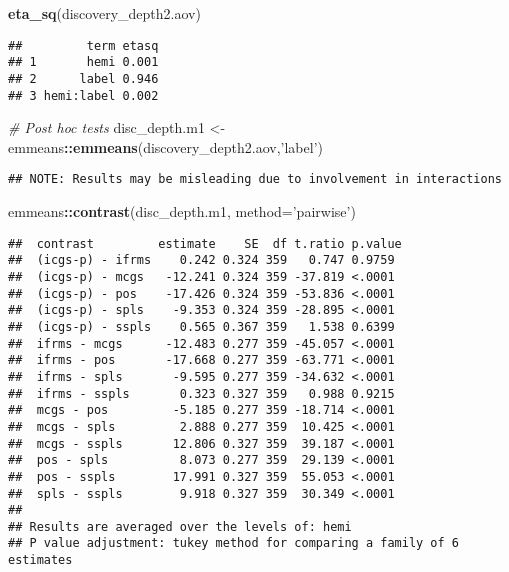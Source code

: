 \documentclass[
]{article}
\newenvironment{Shaded}{\begin{snugshade}}{\end{snugshade}}
\newcommand{\CommentTok}[1]{\textcolor[rgb]{0.56,0.35,0.01}{\textit{#1}}}
\newcommand{\DataTypeTok}[1]{\textcolor[rgb]{0.13,0.29,0.53}{#1}}
\newcommand{\KeywordTok}[1]{\textcolor[rgb]{0.13,0.29,0.53}{\textbf{#1}}}
\newcommand{\NormalTok}[1]{#1}
\newcommand{\OperatorTok}[1]{\textcolor[rgb]{0.81,0.36,0.00}{\textbf{#1}}}
\newcommand{\StringTok}[1]{\textcolor[rgb]{0.31,0.60,0.02}{#1}}
\begin{document}
\begin{Shaded}
\begin{Highlighting}[]
\KeywordTok{eta_sq}\NormalTok{(discovery_depth2.aov)}
\end{Highlighting}
\end{Shaded}

\begin{verbatim}
##         term etasq
## 1       hemi 0.001
## 2      label 0.946
## 3 hemi:label 0.002
\end{verbatim}

\begin{Shaded}
\begin{Highlighting}[]
\CommentTok{# Post hoc tests }
\NormalTok{disc_depth.m1 <-}\StringTok{ }\NormalTok{emmeans}\OperatorTok{::}\KeywordTok{emmeans}\NormalTok{(discovery_depth2.aov,}\StringTok{'label'}\NormalTok{)}
\end{Highlighting}
\end{Shaded}

\begin{verbatim}
## NOTE: Results may be misleading due to involvement in interactions
\end{verbatim}

\begin{Shaded}
\begin{Highlighting}[]
\NormalTok{emmeans}\OperatorTok{::}\KeywordTok{contrast}\NormalTok{(disc_depth.m1, }\DataTypeTok{method=}\StringTok{'pairwise'}\NormalTok{)}
\end{Highlighting}
\end{Shaded}

\begin{verbatim}
##  contrast         estimate    SE  df t.ratio p.value
##  (icgs-p) - ifrms    0.242 0.324 359   0.747 0.9759 
##  (icgs-p) - mcgs   -12.241 0.324 359 -37.819 <.0001 
##  (icgs-p) - pos    -17.426 0.324 359 -53.836 <.0001 
##  (icgs-p) - spls    -9.353 0.324 359 -28.895 <.0001 
##  (icgs-p) - sspls    0.565 0.367 359   1.538 0.6399 
##  ifrms - mcgs      -12.483 0.277 359 -45.057 <.0001 
##  ifrms - pos       -17.668 0.277 359 -63.771 <.0001 
##  ifrms - spls       -9.595 0.277 359 -34.632 <.0001 
##  ifrms - sspls       0.323 0.327 359   0.988 0.9215 
##  mcgs - pos         -5.185 0.277 359 -18.714 <.0001 
##  mcgs - spls         2.888 0.277 359  10.425 <.0001 
##  mcgs - sspls       12.806 0.327 359  39.187 <.0001 
##  pos - spls          8.073 0.277 359  29.139 <.0001 
##  pos - sspls        17.991 0.327 359  55.053 <.0001 
##  spls - sspls        9.918 0.327 359  30.349 <.0001 
## 
## Results are averaged over the levels of: hemi 
## P value adjustment: tukey method for comparing a family of 6 estimates
\end{verbatim}
\end{document}

